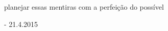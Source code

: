 \begin{poem}
\begin{stanza}
planejar essas mentiras\verseline
com a perfeição\verseline
do possível
\end{stanza}
\end{poem}

\par\null
 - 21.4.2015